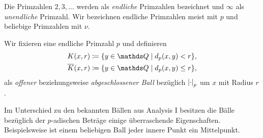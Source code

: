 \begin{bem}
Die Primzahlen $2,3,\dots$ werden als \emph{endliche} Primzahlen bezeichnet und $\infty$ als \emph{unendliche} Primzahl.
Wir bezeichnen endliche Primzahlen meist mit $p$ und beliebige Primzahlen mit $\nu$.
\end{bem}

\begin{defi}
Wir fixieren eine endliche Primzahl $p$ und definieren
\begin{align*}
K(x,r)\coloneqq\{y \in \Q \mid d_p(x,y)<r\},\\
\overline{K}(x,r) \coloneqq \{y\in \Q \mid d_p(x,y)\leq r\},
\end{align*}
als \emph{offener} beziehungsweise \emph{abgeschlossener Ball}
bezüglich $\left\vert\cdot\right\vert_p$ um $x$ mit Radius $r$.
\end{defi}

Im Unterschied zu den bekannten Bällen aus Analysis I besitzen die Bälle
bezüglich der $p$-adischen Beträge einige überraschende Eigenschaften.
Beispielsweise ist einem beliebigen Ball jeder innere Punkt ein Mittelpunkt.

